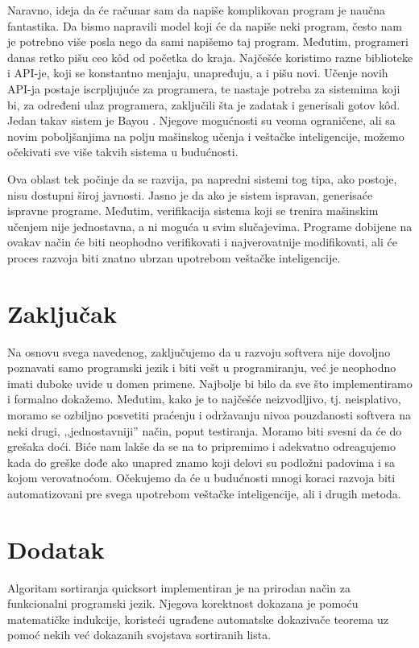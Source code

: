 \documentclass[a4paper]{article}
\begin{document}
Naravno, ideja da će računar sam da napiše komplikovan program je naučna fantastika. Da bismo napravili model koji će da napiše neki program, često nam je potrebno više posla nego da sami napišemo taj program. Međutim, programeri danas retko pišu ceo k\^{o}d od početka do kraja. Najčešće koristimo razne biblioteke i API-je, koji se konstantno menjaju, unapređuju, a i pišu novi. Učenje novih API-ja postaje iscrpljujuće za programera, te nastaje potreba za sistemima koji bi, za određeni ulaz programera, zaključili šta je zadatak i generisali gotov k\^{o}d. Jedan takav sistem je Bayou \cite{bayou}. Njegove mogućnosti su veoma ograničene, ali sa novim poboljšanjima na polju mašinskog učenja i veštačke inteligencije, možemo očekivati sve više takvih sistema u budućnosti.

Ova oblast tek počinje da se razvija, pa napredni sistemi tog tipa, ako postoje, nisu dostupni široj javnosti. Jasno je da ako je sistem ispravan, generisaće ispravne programe. Međutim, verifikacija sistema koji se trenira mašinskim učenjem nije jednostavna, a ni moguća u svim slučajevima. Programe dobijene na ovakav način će biti neophodno verifikovati i najverovatnije modifikovati, ali će proces razvoja biti znatno ubrzan upotrebom veštačke inteligencije. 

\section{Zaključak}
\label{sec:zakljucak}
Na osnovu svega navedenog, zaključujemo da u razvoju softvera nije dovoljno poznavati samo programski jezik i biti vešt u programiranju,
već je neophodno imati duboke uvide u domen primene.
Najbolje bi bilo da sve što implementiramo i formalno dokažemo.
Međutim, kako je to najčešće neizvodljivo, tj. neisplativo, moramo se ozbiljno posvetiti praćenju i održavanju nivoa pouzdanosti softvera
na neki drugi, ,,jednostavniji'' način, poput testiranja.
Moramo biti svesni da će do grešaka doći. 
Biće nam lakše da se na to pripremimo i adekvatno odreagujemo kada do greške dođe
ako unapred znamo koji delovi su podložni padovima i sa kojom verovatnoćom.
Očekujemo da će u budućnosti mnogi koraci razvoja biti automatizovani pre svega upotrebom veštačke inteligencije, ali i drugih metoda.

\appendix
 


\clearpage

\appendix
\section{Dodatak}
\label{sec:dodatak}
Algoritam sortiranja quicksort implementiran je na prirodan način za funkcionalni programski jezik.
Njegova korektnost dokazana je pomoću matematičke indukcije, koristeći ugrađene automatske dokazivače teorema uz pomoć nekih već dokazanih svojstava sortiranih lista.
\end{document}
